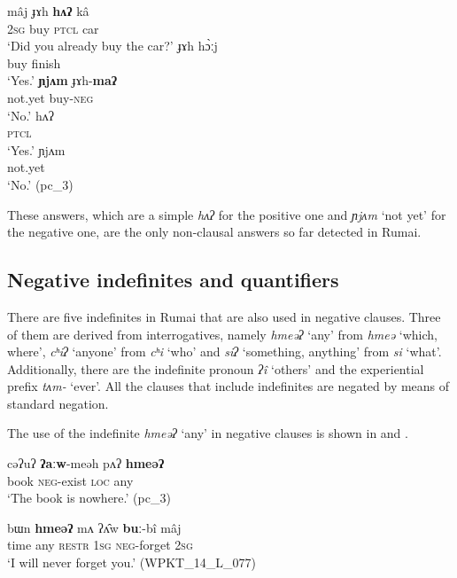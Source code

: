 \documentclass[output=paper,colorlinks,citecolor=brown]{langscibook}
\begin{document}
\ea\label{ex:rum:57}
    \ea\label{ex:rum:57a}
        \gll mâj	ɟɤh	\textbf{hʌʔ}	kâ \\ 
             \textsc{2sg} buy \textsc{ptcl} car \\
        \glt ‘Did you already buy the car?’
    \ex\label{ex:rum:57b}
        \gll ɟɤh	hɔ̀ːj \\
             buy finish \\
        \glt ‘Yes.’
    \ex\label{ex:rum:57c}
        \gll \textbf{ɲjʌm}	ɟɤh-\textbf{maʔ} \\
             not.yet buy-\textsc{neg} \\
        \glt ‘No.’
    \ex\label{ex:rum:57d}
        \gll hʌʔ \\
             \textsc{ptcl} \\
        \glt ‘Yes.’ 
    \ex\label{ex:rum:57e}
        \gll ɲjʌm \\
             not.yet \\
        \glt ‘No.’ (pc\_3)
    \z
\z 
 
These answers, which are a simple \textit{hʌʔ} for the positive one and \textit{ɲjʌm} ‘not yet’ for the negative one, are the only non-clausal answers so far detected in Rumai.

\subsection{Negative indefinites and quantifiers} \label{sec:rum:3.2}

There are five indefinites in Rumai that are also used in negative clauses. Three of them are derived from interrogatives, namely \textit{hmeəʔ} ‘any’ from \textit{hmeə} ‘which, where’, \textit{cʰiʔ} ‘anyone’ from \textit{cʰi} ‘who’ and \textit{siʔ} ‘something, anything’ from \textit{si} ‘what’. Additionally, there are the indefinite pronoun \textit{ʔî} ‘others’ and the experiential prefix \textit{tʌm-} ‘ever’. All the clauses that include indefinites are negated by means of standard negation.

The use of the indefinite \textit{hmeəʔ} ‘any’ in negative clauses is shown in  and .

\ea\label{ex:rum:58}
    \gll cəʔuʔ	\textbf{ʔaːw}-meəh	pʌʔ	\textbf{hmeəʔ}\\
         book \textsc{neg}{}-exist \textsc{loc} any \\
    \glt ‘The book is nowhere.’ (pc\_3)
\z 

\ea\label{ex:rum:59}
    \gll bɯn	\textbf{hmeəʔ}	mʌ	ʔʌ̂w	\textbf{buː}-bî	mâj \\
         time any \textsc{restr} 1\textsc{sg} \textsc{neg}{}-forget 2\textsc{sg} \\
    \glt ‘I will never forget you.’ (WPKT\_14\_L\_077)
\z 
 
\end{document}

